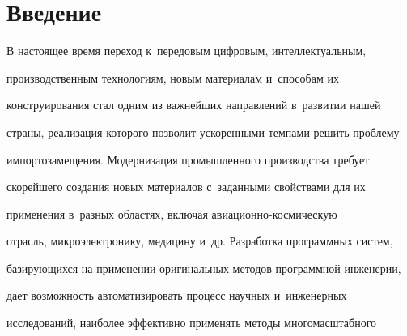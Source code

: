 














 \thispagestyle{headings}


 


 \vspace*{-22pt}





\section{Введение}





\vspace*{-4pt}





     В настоящее время переход к~передовым цифровым, интеллектуальным, 


производственным технологиям, новым материалам и~способам их 


конструирования стал одним из важнейших направлений в~развитии нашей 


страны, реализация которого позволит ускоренными темпами решить проблему 


импортозамещения. Модернизация промышленного производства требует 


скорейшего создания новых материалов с~заданными свойствами для их 


применения в~разных областях, включая авиа\-ци\-он\-но-кос\-ми\-че\-скую 


отрасль, микроэлектронику, медицину и~др. Разработка программных систем, 


базирующихся на применении оригинальных методов программной инженерии, 


дает возможность автоматизировать процесс научных и~инженерных 


исследований, наиболее эффективно применять методы многомасштабного 


